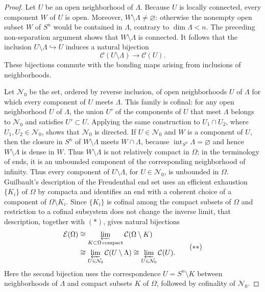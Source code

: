 \documentclass[12pt,oneside,a4paper]{article}
\theoremstyle{mytheorem}
\theoremstyle{remark}
\theoremstyle{definition}
\begin{document}
\begin{proof}
Let \(U\) be an open neighborhood of \(\Lambda\). Because \(U\) is locally
connected, every component \(W\) of \(U\) is open. Moreover,
\(W\setminus\Lambda\neq\varnothing\): otherwise the nonempty open subset
\(W\) of \(S^n\) would be contained in \(\Lambda\), contrary to
\(\dim\Lambda<n\). The preceding non-separation argument shows that
\(W\setminus\Lambda\) is connected. It follows that the inclusion
\(U\setminus\Lambda\hookrightarrow U\) induces a natural bijection
\[
\mathcal C(U\setminus\Lambda)\longrightarrow\mathcal C(U).
\tag{\(*\)}
\]
These bijections commute with the bonding maps arising from inclusions of
neighborhoods.

Let \(\mathcal N_0\) be the set, ordered by reverse inclusion, of open
neighborhoods \(U\) of \(\Lambda\) for which every component of \(U\)
meets \(\Lambda\). This family is cofinal: for any open neighborhood \(U\)
of \(\Lambda\), the union \(U'\) of the components of \(U\) that meet
\(\Lambda\) belongs to \(\mathcal N_0\) and satisfies \(U'\subset U\).
Applying the same construction to \(U_1\cap U_2\), where
\(U_1,U_2\in\mathcal N_0\), shows that \(\mathcal N_0\) is directed. If
\(U\in\mathcal N_0\) and \(W\) is a component of \(U\), then the closure in
\(S^n\) of \(W\setminus\Lambda\) meets \(W\cap\Lambda\), because
\(\operatorname{int}_{S^n}\Lambda=\varnothing\) and hence
\(W\setminus\Lambda\) is dense in \(W\). Thus
\(W\setminus\Lambda\) is not relatively compact in \(\Omega\); in the
terminology of ends, it is an unbounded component of the corresponding
neighborhood of infinity. Thus every component of \(U\setminus\Lambda\), for
\(U\in\mathcal N_0\), is unbounded in \(\Omega\). Guilbault's description of the
Freudenthal end set \cite[Section~3.3.1]{zbMATH07206284} uses an efficient
exhaustion \(\{K_i\}\) of \(\Omega\) by compacta and identifies an end with a
coherent choice of a component of \(\Omega\setminus K_i\). Since
\(\{K_i\}\) is cofinal among the compact subsets of \(\Omega\) and
restriction to a cofinal subsystem does not change the inverse limit, that
description, together with \((*)\), gives
natural bijections
\[
\begin{aligned}
\mathcal E(\Omega)
&\cong
\varprojlim_{K\subset\Omega\,\mathrm{compact}}
   \mathcal C(\Omega\setminus K)\\
&\cong
\varprojlim_{U\in\mathcal N_0}
   \mathcal C(U\setminus\Lambda)
\cong
\varprojlim_{U\in\mathcal N_0}\mathcal C(U).
\end{aligned}
\tag{\(**\)}
\]
Here the second bijection uses the correspondence
\(U=S^n\setminus K\) between neighborhoods of \(\Lambda\) and compact
subsets \(K\) of \(\Omega\), followed by cofinality of \(\mathcal N_0\).


\end{proof}
\end{document}
